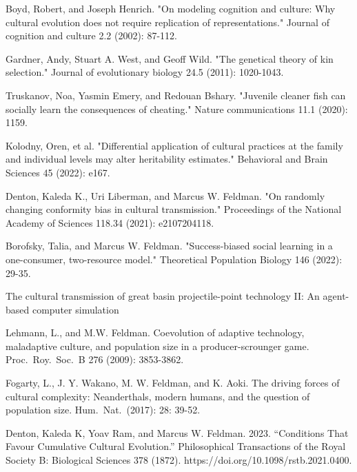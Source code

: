 \documentclass[12pt]{extarticle}
\begin{document}
\begin{thebibliography}{}
Boyd, Robert, and Joseph Henrich. "On modeling cognition and culture: Why cultural evolution does not require replication of representations." Journal of cognition and culture 2.2 (2002): 87-112.

Gardner, Andy, Stuart A. West, and Geoff Wild. "The genetical theory of kin selection." Journal of evolutionary biology 24.5 (2011): 1020-1043.

Truskanov, Noa, Yasmin Emery, and Redouan Bshary. "Juvenile cleaner fish can socially learn the consequences of cheating." Nature communications 11.1 (2020): 1159.

Kolodny, Oren, et al. "Differential application of cultural practices at the family and individual levels may alter heritability estimates." Behavioral and Brain Sciences 45 (2022): e167.

Denton, Kaleda K., Uri Liberman, and Marcus W. Feldman. "On randomly changing conformity bias in cultural transmission." Proceedings of the National Academy of Sciences 118.34 (2021): e2107204118.

Borofsky, Talia, and Marcus W. Feldman. "Success-biased social learning in a one-consumer, two-resource model." Theoretical Population Biology 146 (2022): 29-35.

The cultural transmission of great basin projectile-point technology II: An agent-based computer simulation

Lehmann, L., and M.W. Feldman. Coevolution of adaptive technology, maladaptive culture, and population size in a producer-scrounger game. Proc.\ Roy.\ Soc.\ B 276 (2009): 3853-3862.

Fogarty, L., J. Y. Wakano, M. W. Feldman, and K. Aoki. The driving forces of cultural complexity: Neanderthals, modern humans, and the question of population size. Hum.\ Nat.\ (2017): 28: 39-52.

Denton, Kaleda K, Yoav Ram, and Marcus W. Feldman. 2023. “Conditions That Favour Cumulative Cultural Evolution.” Philosophical Transactions of the Royal Society B: Biological Sciences 378 (1872). https://doi.org/10.1098/rstb.2021.0400.


\end{thebibliography}

\pagebreak
\end{document}
